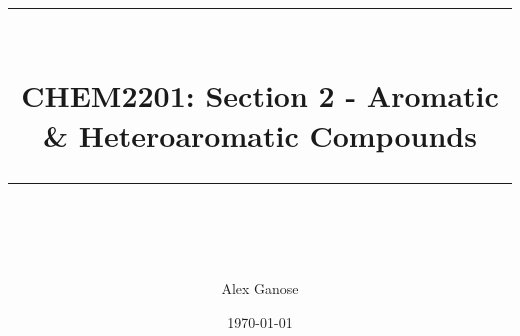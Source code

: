 \newcommand{\horrule}[1]{\rule{\linewidth}{#1}} %
\title{
  \normalfont \normalsize
  \horrule{0.5pt} \\[0.4cm]
  \huge CHEM2201: Section 2 - Aromatic \& Heteroaromatic Compounds \\
  \horrule{2pt} \\[0.5cm]
}

\author{Alex Ganose}
\date{\normalsize\today}